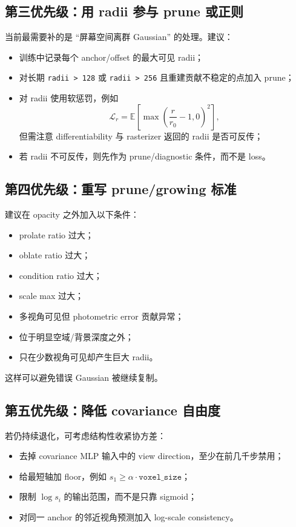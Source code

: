 \documentclass[11pt,a4paper]{article}
\begin{document}
\subsection{第三优先级：用 radii 参与 prune 或正则}

当前最需要补的是 ``屏幕空间离群 Gaussian'' 的处理。建议：
\begin{itemize}[leftmargin=1.5em]
  \item 训练中记录每个 anchor/offset 的最大可见 radii；
  \item 对长期 \texttt{radii > 128} 或 \texttt{radii > 256} 且重建贡献不稳定的点加入 prune；
  \item 对 radii 使用软惩罚，例如
  \[
    \mathcal{L}_{r}
    =
    \mathbb{E}
    \left[
      \max\left(\frac{r}{r_0}-1,0\right)^2
    \right],
  \]
  但需注意 differentiability 与 rasterizer 返回的 radii 是否可反传；
  \item 若 radii 不可反传，则先作为 prune/diagnostic 条件，而不是 loss。
\end{itemize}

\subsection{第四优先级：重写 prune/growing 标准}

建议在 opacity 之外加入以下条件：
\begin{itemize}[leftmargin=1.5em]
  \item prolate ratio 过大；
  \item oblate ratio 过大；
  \item condition ratio 过大；
  \item scale max 过大；
  \item 多视角可见但 photometric error 贡献异常；
  \item 位于明显空域/背景深度之外；
  \item 只在少数视角可见却产生巨大 radii。
\end{itemize}
这样可以避免错误 Gaussian 被继续复制。

\subsection{第五优先级：降低 covariance 自由度}

若仍持续退化，可考虑结构性收紧协方差：
\begin{itemize}[leftmargin=1.5em]
  \item 去掉 covariance MLP 输入中的 view direction，至少在前几千步禁用；
  \item 给最短轴加 floor，例如 \(s_1 \ge \alpha \cdot \texttt{voxel\_size}\)；
  \item 限制 \(\log s_i\) 的输出范围，而不是只靠 sigmoid；
  \item 对同一 anchor 的邻近视角预测加入 log-scale consistency。
\end{itemize}
\end{document}
